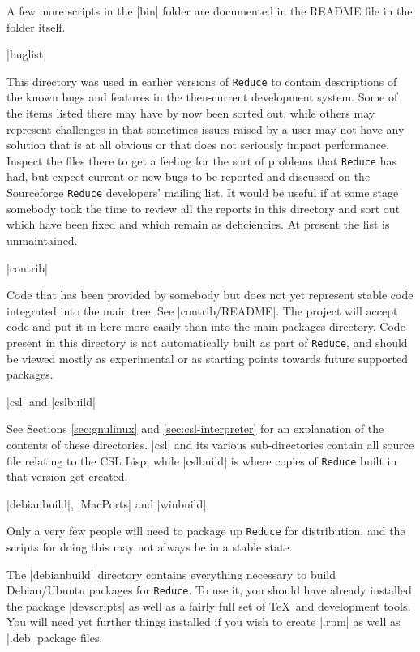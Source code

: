 \documentclass[12pt,twoside,openright]{memoir}
\newcommand{\reduce}{\texttt{Reduce}\xspace}
\begin{document}
\begin{description}
A few more scripts in the |bin| folder are documented in the README file in the
folder itself.

\item |buglist|

  This directory was used in earlier versions of \reduce to contain
  descriptions of the known bugs and features in the then-current development
  system. Some of the items listed there may have by now been sorted out, while
  others may represent challenges in that sometimes issues raised by a user may
  not have any solution that is at all obvious or that does not seriously
  impact performance. Inspect the files there to get a feeling for the sort of
  problems that \reduce has had, but expect current or new bugs to be reported
  and discussed on the Sourceforge \reduce developers' mailing list.  It would
  be useful if at some stage somebody took the time to review all the reports
  in this directory and sort out which have been fixed and which remain as
  deficiencies. At present the list is unmaintained.

\item |contrib|

Code that has been provided by somebody but does not yet represent stable
code integrated into the main tree. See |contrib/README|. The project will
accept code and put it in here more easily than into the main packages
directory. Code present in this directory is not automatically built
as part of \reduce, and should be viewed mostly as experimental or as
starting points towards future supported packages.

\item |csl| and |cslbuild|

  See Sections \ref{sec:gnulinux} and \ref{sec:csl-interpreter} for an
  explanation of the contents of these directories. |csl| and its
  various sub-directories contain all source file relating to the CSL
  Lisp, while |cslbuild| is where copies of \reduce built in that version
  get created.

\item |debianbuild|, |MacPorts| and |winbuild|

  Only a very few people will need to package up \reduce for distribution,
and the scripts for doing this may not always be in a stable state. 

The |debianbuild| directory contains everything necessary to build
Debian/Ubuntu packages for \reduce. To use it, you should have already
installed the package |devscripts| as well as a fairly full set of \TeX\ and
development tools. You will need yet further things installed if you wish to
create |.rpm| as well as |.deb| package files.


\end{description}
\end{document}

